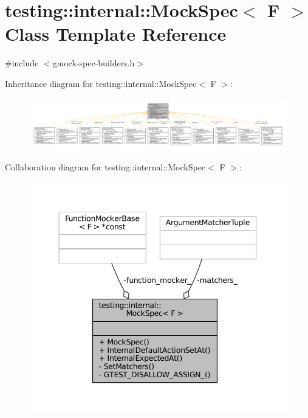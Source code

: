 \hypertarget{classtesting_1_1internal_1_1MockSpec}{}\section{testing\+:\+:internal\+:\+:Mock\+Spec$<$ F $>$ Class Template Reference}
\label{classtesting_1_1internal_1_1MockSpec}


{\ttfamily \#include $<$gmock-\/spec-\/builders.\+h$>$}



Inheritance diagram for testing\+:\+:internal\+:\+:Mock\+Spec$<$ F $>$\+:
\nopagebreak
\begin{figure}[H]
\begin{center}
\leavevmode
\includegraphics[width=350pt]{classtesting_1_1internal_1_1MockSpec__inherit__graph}
\end{center}
\end{figure}


Collaboration diagram for testing\+:\+:internal\+:\+:Mock\+Spec$<$ F $>$\+:
\nopagebreak
\begin{figure}[H]
\begin{center}
\leavevmode
\includegraphics[width=344pt]{classtesting_1_1internal_1_1MockSpec__coll__graph}
\end{center}
\end{figure}
